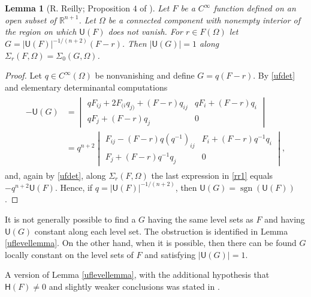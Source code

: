 \documentclass [leqno, 10pt]{amsart}
\newtheorem{lemma}[theorem]{Lemma}
\theoremstyle{definition}
\numberwithin{equation}{section}
\newcommand{\Om}{\Omega}
\newcommand{\U}{\mathsf{U}}
\newcommand{\lc}{\Sigma}
\renewcommand{\H}{\mathsf{H}}
\newcommand{\cinf}{C^{\infty}}
\newcommand{\sign}{\operatorname{sgn}}
\newcommand{\rea}{\mathbb R}
\begin{document}
\begin{lemma}[R. Reilly; Proposition $4$ of \cite{Reilly-affine}]
Let $F$ be a $\cinf$ function defined on an open subset of $\rea^{n+1}$. Let $\Omega$ be a connected component with nonempty interior of the region on which $\U(F)$ does not vanish. For $r \in F(\Om)$ let $G = |\U(F)|^{-1/(n+2)}(F - r)$. Then $|\U(G)| = 1$ along $\lc_{r}(F, \Om) = \lc_{0}(G, \Om)$. 
\end{lemma}
\begin{proof}
Let $q \in \cinf(\Om)$ be nonvanishing and define $G = q(F - r)$. By \eqref{ufdet} and elementary determinantal computations
\begin{align}\label{rr1}
\begin{split}
-\U(G) & = \begin{vmatrix} qF_{ij} + 2F_{(i}q_{j)} + (F-r)q_{ij} & qF_{i} + (F-r)q_{i} \\  qF_{j} + (F-r)q_{j} & 0 \end{vmatrix}\\
& = q^{n+2}\begin{vmatrix} F_{ij} - (F - r)q(q^{-1})_{ij}  & F_{i} + (F - r)q^{-1}q_{i}\\ F_{j} + (F - r)q^{-1}q_{j}  & 0 \end{vmatrix}, 
\end{split}
\end{align}
and, again by \eqref{ufdet}, along $\lc_{r}(F, \Om)$ the last expression in \eqref{rr1} equals $-q^{n+2}\U(F)$. Hence, if $q = |\U(F)|^{-1/(n+2)}$, then $\U(G) = \sign(\U(F))$.
\end{proof}
It is not generally possible to find a $G$ having the same level sets as $F$ and having $\U(G)$ constant along each level set. The obstruction is identified in Lemma \ref{uflevellemma}. On the other hand, when it is possible, then there can be found $G$ locally constant on the level sets of $F$ and satisfying $|\U(G)| = 1$.

A version of Lemma \ref{uflevellemma}, with the additional hypothesis that $\H(F) \neq 0$ and slightly weaker conclusions was stated in \cite{Fox-prehom}.
\end{document}
